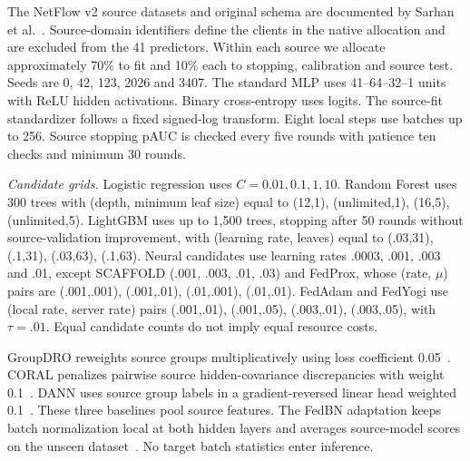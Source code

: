 \documentclass[journal,10pt]{IEEEtran}
\begin{document}
The NetFlow v2 source datasets and original schema are documented by Sarhan et al.~\cite{sarhan2022}. Source-domain identifiers define the clients in the native allocation and are excluded from the 41 predictors. Within each source we allocate approximately 70\% to fit and 10\% each to stopping, calibration and source test. Seeds are 0, 42, 123, 2026 and 3407. The standard MLP uses 41--64--32--1 units with ReLU hidden activations. Binary cross-entropy uses logits. The source-fit standardizer follows a fixed signed-log transform. Eight local steps use batches up to 256. Source stopping pAUC is checked every five rounds with patience ten checks and minimum 30 rounds. 

\emph{Candidate grids.} Logistic regression uses $C=0.01,0.1,1,10$. Random Forest uses 300 trees with (depth, minimum leaf size) equal to (12,1), (unlimited,1), (16,5), (unlimited,5). LightGBM uses up to 1,500 trees, stopping after 50 rounds without source-validation improvement, with (learning rate, leaves) equal to (.03,31), (.1,31), (.03,63), (.1,63). Neural candidates use learning rates .0003, .001, .003 and .01, except SCAFFOLD (.001, .003, .01, .03) and FedProx, whose (rate, $\mu$) pairs are (.001,.001), (.001,.01), (.01,.001), (.01,.01). FedAdam and FedYogi use (local rate, server rate) pairs (.001,.01), (.001,.05), (.003,.01), (.003,.05), with $\tau=.01$. Equal candidate counts do not imply equal resource costs.

GroupDRO reweights source groups multiplicatively using loss coefficient 0.05~\cite{sagawa}. CORAL penalizes pairwise source hidden-covariance discrepancies with weight 0.1~\cite{coral}. DANN uses source group labels in a gradient-reversed linear head weighted 0.1~\cite{dann}. These three baselines pool source features. The FedBN adaptation keeps batch normalization local at both hidden layers and averages source-model scores on the unseen dataset~\cite{fedbn}. No target batch statistics enter inference.
\end{document}
